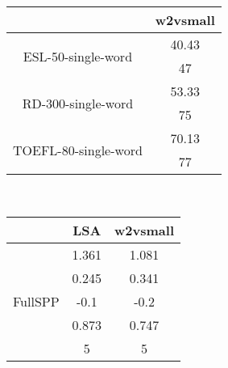 \documentclass{article}
\begin{document}
\begin{tabular}{cc|}\cline{2-2}
&\multicolumn{1}{|c|}{w2vsmall} \\\hline
\multicolumn{1}{|c|}{\multirow{2}{*}{ESL-50-single-word}} & 40.43 \\
\multicolumn{1}{|c|}{} & 47 \\
\hline
\multicolumn{1}{|c|}{\multirow{2}{*}{RD-300-single-word}} & 53.33 \\
\multicolumn{1}{|c|}{} & 75 \\
\hline
\multicolumn{1}{|c|}{\multirow{2}{*}{TOEFL-80-single-word}} & 70.13 \\
\multicolumn{1}{|c|}{} & 77 \\
\hline
\end{tabular}\\
\begin{tabular}{ccc|}\cline{2-3}
&\multicolumn{1}{|c}{LSA} & w2vsmall \\\hline
\multicolumn{1}{|c|}{\multirow{5}{*}{FullSPP}} & 1.361 & 1.081 \\
\multicolumn{1}{|c|}{} & 0.245 & 0.341 \\
\multicolumn{1}{|c|}{} & -0.1 & -0.2 \\
\multicolumn{1}{|c|}{} & 0.873 & 0.747 \\
\multicolumn{1}{|c|}{} & 5 & 5 \\
\hline
\end{tabular}\\
\end{document}
